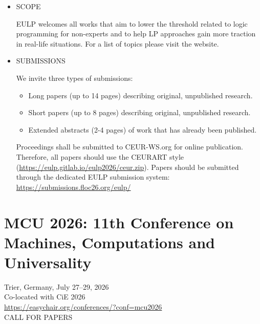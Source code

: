 \documentclass[prodmode,acmtecs]{acmsmall} %
\begin{document}
\begin{itemize}
\item  SCOPE 
 
  EULP welcomes all works that aim to lower the threshold related to logic programming for non-experts and to help LP approaches gain more traction in real-life situations. For a list of topics please visit the website. 
 
\item  SUBMISSIONS 
 
  We invite three types of submissions: 
 
\begin{itemize}\item  Long papers (up to 14 pages) describing original, unpublished research.
\item  Short papers (up to 8 pages) describing original, unpublished research.
\item  Extended abstracts (2-4 pages) of work that has already been published.
\end{itemize} 
  Proceedings shall be submitted to CEUR-WS.org for online publication. Therefore, all papers should use the CEURART style (\href{https://eulp.gitlab.io/eulp2026/ceur.zip}{https://eulp.gitlab.io/eulp2026/ceur.zip}). Papers should be submitted through the dedicated EULP submission system: \href{https://submissions.floc26.org/eulp/}{https://submissions.floc26.org/eulp/} 
 
\end{itemize}\section{MCU 2026: 11th Conference on Machines, Computations and Universality}\label{MCU2026}  Trier, Germany, July 27–29, 2026\\ 
  Co-located with CiE 2026\\ 
  \href{https://easychair.org/conferences/?conf=mcu2026}{https://easychair.org/conferences/?conf=mcu2026}\\ 
CALL FOR PAPERS 
\end{document}
